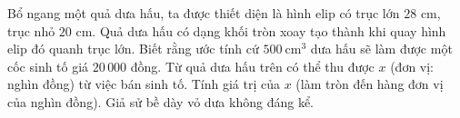 \begin{ex}
Bổ ngang một quả dưa hấu, ta được thiết diện là hình elip có trục lớn $28$ cm, trục nhỏ $20$ cm. Quả dưa hấu có dạng khối tròn xoay tạo thành khi quay hình elip đó quanh trục lớn. Biết rằng ước tính cứ $500\ \mathrm{cm}^3$ dưa hấu sẽ làm được một cốc sinh tố giá $20\,000$ đồng. Từ quả dưa hấu trên có thể thu được $x$ (đơn vị: nghìn đồng) từ việc bán sinh tố. Tính giá trị của $x$ (làm tròn đến hàng đơn vị của nghìn đồng). Giả sử bề dày vỏ dưa không đáng kể.
\end{ex}
